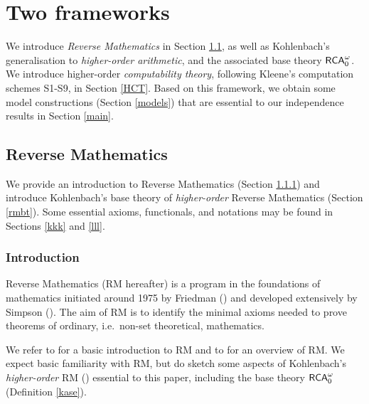\documentclass[reqno]{amsart}
\def\RCAo{\textup{\textsf{RCA}}_{0}^{\omega}}
\numberwithin{equation}{section}
\numberwithin{thm}{section}
\begin{document}
\section{Two frameworks}\label{prelim}

We introduce \emph{Reverse Mathematics} in Section \ref{prelim1}, as well as Kohlenbach's generalisation to \emph{higher-order arithmetic}, and the associated base theory $\RCAo$.  %
We introduce higher-order \emph{computability theory}, following Kleene's computation schemes S1-S9, in Section \ref{HCT}. 
Based on this framework, we obtain some model constructions (Section \ref{models}) that are essential to our independence results in Section \ref{main}.  

\subsection{Reverse Mathematics}\label{prelim1}
We provide an introduction to Reverse Mathematics (Section \ref{introrm}) and introduce Kohlenbach's base theory of \emph{higher-order} Reverse Mathematics (Section \ref{rmbt}).
Some essential axioms, functionals, and notations may be found in Sections \ref{kkk} and \ref{lll}.
\subsubsection{Introduction}\label{introrm}
Reverse Mathematics (RM hereafter) is a program in the foundations of mathematics initiated around 1975 by Friedman (\cites{fried,fried2}) and developed extensively by Simpson (\cite{simpson2}).  
The aim of RM is to identify the minimal axioms needed to prove theorems of ordinary, i.e.\ non-set theoretical, mathematics. 

\smallskip

We refer to \cite{stillebron} for a basic introduction to RM and to \cite{simpson2, simpson1} for an overview of RM.  We expect basic familiarity with RM, but do sketch some aspects of Kohlenbach's \emph{higher-order} RM (\cite{kohlenbach2}) essential to this paper, including the base theory $\RCAo$ (Definition \ref{kase}).  

\smallskip
\end{document}
